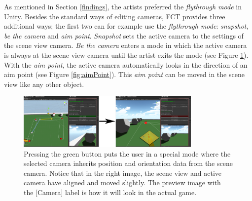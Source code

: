 As mentioned in Section \ref{findings}, the artists preferred the \textit{flythrough mode} in Unity. Besides the standard ways of editing cameras, FCT provides three additional ways; the first two can for example use the \textit{flythrough mode}: \textit{snapshot}, \textit{be the camera} and \textit{aim point}. \textit{Snapshot} sets the active camera to the settings of the scene view camera. \textit{Be the camera} enters a mode in which the active camera is always at the scene view camera until the artist exits the mode (see Figure \ref{fig:beTheCam}). With the \textit{aim point}, the active camera automatically looks in the direction of an aim point (see Figure \ref{fig:aimPoint}). This \textit{aim point} can be moved in the scene view like any other object.


\begin{figure}[htbp]
\centering
\includegraphics[width=0.8\textwidth]{Pics/beTheCam}
\caption{Pressing the green button puts the user in a special mode where the selected camera inherits position and orientation data from the scene camera. Notice that in the right image, the scene view and active camera have aligned and moved slightly. The preview image with the [Camera] label is how it will look in the actual game.}
\label{fig:beTheCam}
\end{figure}

